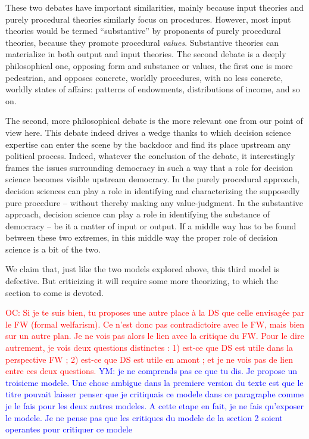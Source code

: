 \documentclass[preprint,11pt]{elsarticle}
\newcommand{\commentYM}[1]{\textcolor{blue}{YM: #1}}
\newcommand{\commentOC}[1]{\textcolor{red}{OC: #1}}
\begin{document}
These two debates have important similarities, mainly because input theories and purely procedural theories similarly focus on procedures. However, most input theories would be termed ``substantive'' by proponents of purely procedural theories, because they promote procedural \emph{values}. Substantive theories can materialize in both output and input theories. The second debate is a deeply philosophical one, opposing form and substance or values, the first one is more pedestrian, and opposes concrete, worldly procedures, with no less concrete, worldly states of affairs: patterns of endowments, distributions of income, and so on.

The second, more philosophical debate is the more relevant one from our point of view here. This debate indeed drives a wedge thanks to which decision science expertise can enter the scene by the backdoor and find its place upstream any political process. Indeed, whatever the conclusion of the debate, it interestingly frames the issues surrounding democracy in such a way that a role for decision science becomes visible upstream democracy. In the purely procedural approach, decision sciences can play a role in identifying and characterizing the supposedly pure procedure -- without thereby making any value-judgment. In the substantive approach, decision science can play a role in identifying the substance of democracy -- be it a matter of input or output. If a middle way has to be found between these two extremes, in this middle way the proper role of decision science is a bit of the two.

We claim that, just like the two models explored above, this third model is defective. But criticizing it will require some more theorizing, to which the section to come is devoted. 

\commentOC{Si je te suis bien, tu proposes une
autre place à la DS que celle envisagée par le FW (formal
welfarism). Ce n’est donc pas contradictoire avec le FW, mais
bien sur un autre plan. Je ne vois pas alors le lien avec la
critique du FW.
Pour le dire autrement, je vois deux questions distinctes : 1)
est-ce que DS est utile dans la perspective FW ; 2) est-ce que
DS est utile en amont ; et je ne vois pas de lien entre ces
deux questions.}
\commentYM{je ne comprends pas ce que tu dis. Je propose un troisieme modele. Une chose ambigue dans la premiere version du texte est que le titre pouvait laisser penser que je critiquais ce modele dans ce paragraphe comme je le fais pour les deux autres modeles. A cette etape en fait, je ne fais qu'exposer le modele. Je ne pense pas que les critiques du modele de la section 2 soient operantes pour critiquer ce modele}
\end{document}
